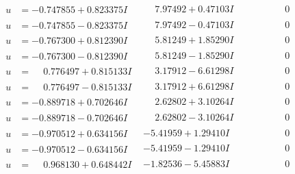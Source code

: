 \documentclass[1p]{elsarticle_modified}
\theoremstyle{definition}
\begin{document}
$$\begin{array}{c|c|c}
\begin{aligned}
u &= -0.747855 + 0.823375 I\end{aligned}
 & \phantom{-}7.97492 + 0.47103 I & \phantom{-0.000000 } 0 \\ \hline\begin{aligned}
u &= -0.747855 - 0.823375 I\end{aligned}
 & \phantom{-}7.97492 - 0.47103 I & \phantom{-0.000000 } 0 \\ \hline\begin{aligned}
u &= -0.767300 + 0.812390 I\end{aligned}
 & \phantom{-}5.81249 + 1.85290 I & \phantom{-0.000000 } 0 \\ \hline\begin{aligned}
u &= -0.767300 - 0.812390 I\end{aligned}
 & \phantom{-}5.81249 - 1.85290 I & \phantom{-0.000000 } 0 \\ \hline\begin{aligned}
u &= \phantom{-}0.776497 + 0.815133 I\end{aligned}
 & \phantom{-}3.17912 - 6.61298 I & \phantom{-0.000000 } 0 \\ \hline\begin{aligned}
u &= \phantom{-}0.776497 - 0.815133 I\end{aligned}
 & \phantom{-}3.17912 + 6.61298 I & \phantom{-0.000000 } 0 \\ \hline\begin{aligned}
u &= -0.889718 + 0.702646 I\end{aligned}
 & \phantom{-}2.62802 + 3.10264 I & \phantom{-0.000000 } 0 \\ \hline\begin{aligned}
u &= -0.889718 - 0.702646 I\end{aligned}
 & \phantom{-}2.62802 - 3.10264 I & \phantom{-0.000000 } 0 \\ \hline\begin{aligned}
u &= -0.970512 + 0.634156 I\end{aligned}
 & -5.41959 + 1.29410 I & \phantom{-0.000000 } 0 \\ \hline\begin{aligned}
u &= -0.970512 - 0.634156 I\end{aligned}
 & -5.41959 - 1.29410 I & \phantom{-0.000000 } 0 \\ \hline\begin{aligned}
u &= \phantom{-}0.968130 + 0.648442 I\end{aligned}
 & -1.82536 - 5.45883 I & \phantom{-0.000000 } 0 \\ \hline\begin{aligned}

\end{aligned}
\end{array}$$
\end{document}
